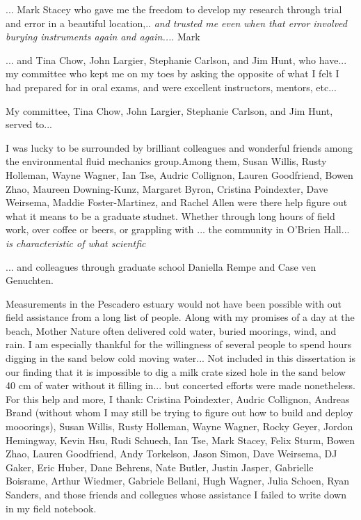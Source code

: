
... Mark Stacey who gave me the freedom to develop my research through trial and error in a beautiful location,.. 
\emph{and trusted me even when that error involved burying instruments again and again...}. Mark 


... and Tina Chow, John Largier, Stephanie Carlson, and Jim Hunt, who have... 
my committee who kept me on my toes by asking the opposite of what I felt I had prepared for in oral exams, and were excellent instructors, mentors, etc... 

My committee, Tina Chow, John Largier, Stephanie Carlson, and Jim Hunt, served to... 

I was lucky to be surrounded by brilliant colleagues and wonderful friends among the environmental fluid mechanics group.Among them, Susan Willis, Rusty Holleman, Wayne Wagner, Ian Tse, Audric Collignon, Lauren Goodfriend, Bowen Zhao, Maureen Downing-Kunz, Margaret Byron, Cristina Poindexter, Dave Weirsema, Maddie Foster-Martinez, and Rachel Allen were there help figure out what it means to be a graduate studnet.  Whether through long hours of field work, over coffee or beers, or grappling with ... the community in O'Brien Hall... \emph{is characteristic of what scientfic }


... and colleagues through graduate school Daniella Rempe and Case ven Genuchten. 

Measurements in the Pescadero estuary would not have been possible with out field assistance from a long list of people. Along with my promises of a day at the beach, Mother Nature often delivered cold water, buried moorings, wind, and rain. I am especially thankful for the willingness of several people to spend hours digging in the sand below cold moving water... Not included in this dissertation is our finding that it is impossible to dig a milk crate sized hole in the sand below 40 cm of water without it filling in... but concerted efforts were made nonetheless.  For this help and more, I thank: Cristina Poindexter, Audric Collignon, Andreas Brand (without whom I may still be trying to figure out how to build and deploy mooorings), Susan Willis, Rusty Holleman, Wayne Wagner, Rocky Geyer, Jordon Hemingway, Kevin Hsu, Rudi Schuech, Ian Tse, Mark Stacey, Felix Sturm, Bowen Zhao, Lauren Goodfriend, Andy Torkelson, Jason Simon, Dave Weirsema, DJ Gaker, Eric Huber, Dane Behrens, Nate Butler, Justin Jasper, Gabrielle Boisrame, Arthur Wiedmer, Gabriele Bellani, Hugh Wagner, Julia Schoen, Ryan Sanders, and those friends and collegues whose assistance I failed to write down in my field notebook. 

